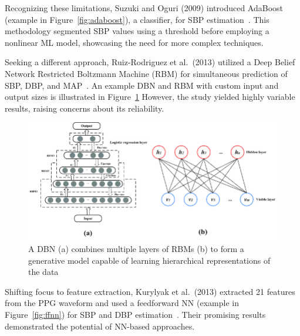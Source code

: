 Recognizing these limitations, Suzuki and Oguri (2009) introduced AdaBoost (example in Figure~\ref{fig:adaboost}), a classifier, for SBP estimation~\cite{suzukiCufflessBloodPressure2009}.
This methodology segmented SBP values using a threshold before employing a nonlinear ML model, showcasing the need for more complex techniques.

Seeking a different approach, Ruiz-Rodriguez et al.\ (2013) utilized a Deep Belief Network Restricted Boltzmann Machine (RBM) for simultaneous prediction of SBP, DBP, and MAP~\cite{ruiz-rodriguezInnovativeContinuousNoninvasive2013a}.
An example DBN and RBM with custom input and output sizes is illustrated in Figure~\ref{fig:rbm}
However, the study yielded highly variable results, raising concerns about its reliability.

\begin{figure}[h]
    \centering
    \includegraphics[scale=0.5]{images/ml/RBM}
    \caption{\small A DBN (a) combines multiple layers of RBMs (b) to form a generative model capable of learning hierarchical representations of the data~\cite{ouIntegratingCellularAutomata2019}}
    \label{fig:rbm}
\end{figure}

Shifting focus to feature extraction, Kurylyak et al.\ (2013) extracted 21 features from the PPG waveform and used a feedforward NN (example in Figure~\ref{fig:ffnn}) for SBP and DBP estimation~\cite{kurylyakNeuralNetworkbasedMethod2013}.
Their promising results demonstrated the potential of NN-based approaches.

